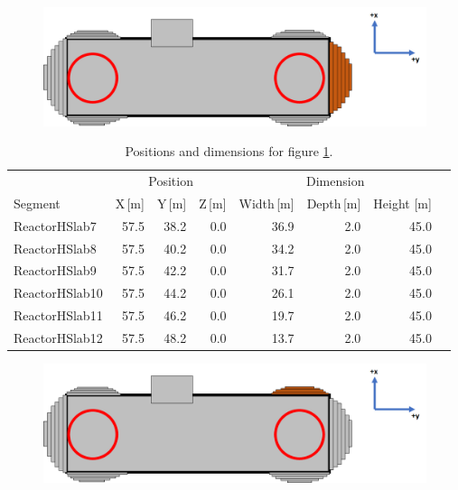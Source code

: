 \begin{figure}[!h]
 \centering
 \includegraphics[width=\linewidth]{Chapter5/Figs/wylfaRasterNew/Slabs2.png}
 \label{fig:slabs2}
\end{figure}

\begin{table}[!h]
\centering
\begin{tabular}{lrrrrrrr}  
\toprule
\multicolumn{1}{c}{} & \multicolumn{3}{c}{Position} & \multicolumn{3}{c}{Dimension} \\
\cmidrule(r){2-4}
\cmidrule(r){5-7}
Segment        & X\,[m] & Y\,[m] & Z\,[m] & Width\,[m] & Depth\,[m] & Height [m]\\
\midrule
ReactorHSlab7  & 57.5   & 38.2   & 0.0    & 36.9       & 2.0        & 45.0\\
ReactorHSlab8  & 57.5   & 40.2   & 0.0    & 34.2       & 2.0        & 45.0\\
ReactorHSlab9  & 57.5   & 42.2   & 0.0    & 31.7       & 2.0        & 45.0\\
ReactorHSlab10 & 57.5   & 44.2   & 0.0    & 26.1       & 2.0        & 45.0\\
ReactorHSlab11 & 57.5   & 46.2   & 0.0    & 19.7       & 2.0        & 45.0\\
ReactorHSlab12 & 57.5   & 48.2   & 0.0    & 13.7       & 2.0        & 45.0\\
\bottomrule  
\end{tabular}
\caption{Positions and dimensions for figure \ref{fig:slabs2}.}
\label{tab:slabs2}
\end{table}

\begin{figure}[!h]
 \centering
 \includegraphics[width=\linewidth]{Chapter5/Figs/wylfaRasterNew/Slabs5.png}
 \label{fig:slabs5}
\end{figure}

